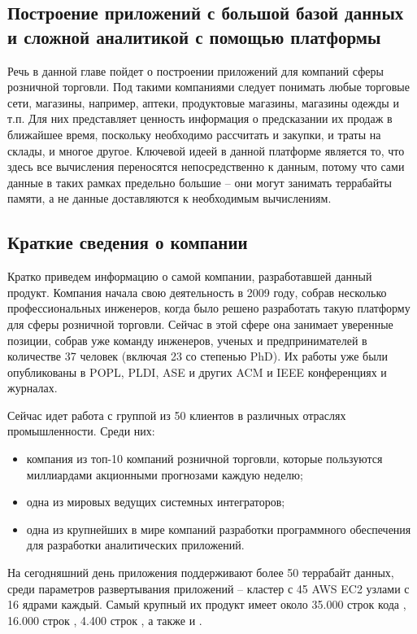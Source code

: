 \subsection{Построение приложений с большой базой данных и сложной аналитикой с помощью платформы \LB}
\label{sec:domain:apps}

Речь в данной главе пойдет о построении приложений для компаний сферы розничной торговли. Под такими компаниями следует понимать любые торговые сети, магазины, например, аптеки, продуктовые магазины, магазины одежды и т.п. Для них представляет ценность информация о предсказании их продаж в ближайшее время, поскольку необходимо рассчитать и закупки, и траты на склады, и многое другое.
Ключевой идеей в данной платформе является то, что здесь все вычисления переносятся непосредственно к данным, потому что сами данные в таких рамках предельно большие – они могут занимать террабайты памяти, а не данные доставляются к необходимым вычислениям.

\subsection{Краткие сведения о компании \LB}
\label{sec:domain:company_notes}

Кратко приведем информацию о самой компании, разработавшей данный продукт.
Компания начала свою деятельность в 2009 году, собрав несколько профессиональных инженеров, когда было решено разработать такую платформу для сферы розничной торговли. Сейчас в этой сфере она занимает уверенные позиции, собрав уже команду инженеров, ученых и предпринимателей в количестве 37 человек (включая 23 со степенью PhD). Их работы уже были опубликованы в POPL, PLDI, ASE и других ACM и IEEE конференциях и журналах.

Сейчас идет работа с группой из 50 клиентов в различных отраслях промышленности. Среди них:
\begin{itemize}
  \item компания из топ-10 компаний розничной торговли, которые пользуются миллиардами акционными прогнозами каждую неделю;
  \item одна из мировых ведущих системных интеграторов;
  \item одна из крупнейших в мире компаний разработки программного обеспечения для разработки аналитических приложений.
\end{itemize}

На сегодняшний день приложения \LB поддерживают более 50 террабайт данных, среди параметров развертывания приложений – кластер с 45 AWS EC2 узлами с 16 ядрами каждый. Самый крупный их продукт имеет около 35.000 строк кода \logiql, 16.000 строк \js, 4.400 строк \java, а также \python и \bash \cite{about_lb}.

